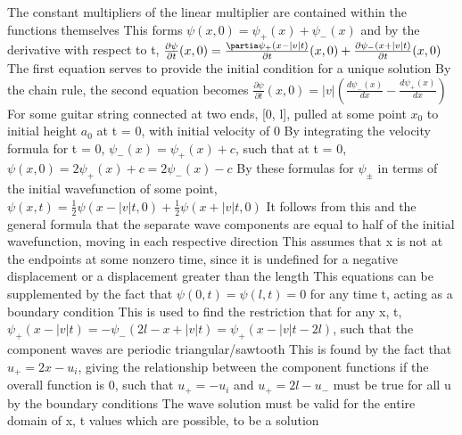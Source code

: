 \documentclass[11 pt, twoside]{article}
\newenvironment{outline*}
{
	\begin{outline}[enumerate]
	}
	{\end{outline}
}
\begin{document}
\begin{outline*}
\3 The constant multipliers of the linear multiplier are contained within the functions themselves
\3 This forms $\psi(x, 0) = \psi_+(x) + \psi_-(x)$ and by the derivative with respect to t, $\frac{\partial \psi}{\partial t}(x, 0) = \frac{\partia \psi_+ (x - |v|t)}{\partial t}(x, 0) + \frac{\partial \psi_- (x + |v|t)}{\partial t}(x, 0)$
\4 The first equation serves to provide the initial condition for a unique solution
\3 By the chain rule, the second equation becomes $\frac{\partial \psi}{\partial t}(x, 0) = |v|(\frac{d\psi_-(x)}{dx} - \frac{d\psi_+(x)}{dx})$
\2 For some guitar string connected at two ends, [0, l], pulled at some point $x_0$ to initial height $a_0$ at t = 0, with initial velocity of 0
\3 By integrating the velocity formula for t = 0, $\psi_-(x) = \psi_+(x) + c$, such that at t = 0, $\psi(x, 0) = 2\psi_+(x) + c = 2\psi_-(x) - c$
\1 By these formulas for $\psi_\pm$ in terms of the initial wavefunction of some point, $\psi(x, t) = \frac{1}{2}\psi(x - |v|t, 0) + \frac{1}{2}\psi(x + |v|t, 0)$
\2 It follows from this and the general formula that the separate wave components are equal to half of the initial wavefunction, moving in each respective direction
\2 This assumes that x is not at the endpoints at some nonzero time, since it is undefined for a negative displacement or a displacement greater than the length
\2 This equations can be supplemented by the fact that $\psi(0, t) = \psi(l, t) = 0$ for any time t, acting as a boundary condition
\2 This is used to find the restriction that for any x, t, $\psi_+(x - |v|t) = -\psi_-(2l - x + |v|t) = \psi_+(x - |v|t - 2l)$, such that the component waves are periodic triangular/sawtooth
\3 This is found by the fact that $u_+ = 2x - u_i$, giving the relationship between the component functions if the overall function is 0, such that $u_+ = -u_i$ and $u_+ = 2l - u_-$ must be true for all u by the boundary conditions
\1 The wave solution must be valid for the entire domain of x, t values which are possible, to be a solution
\end{outline*}
\end{document}

